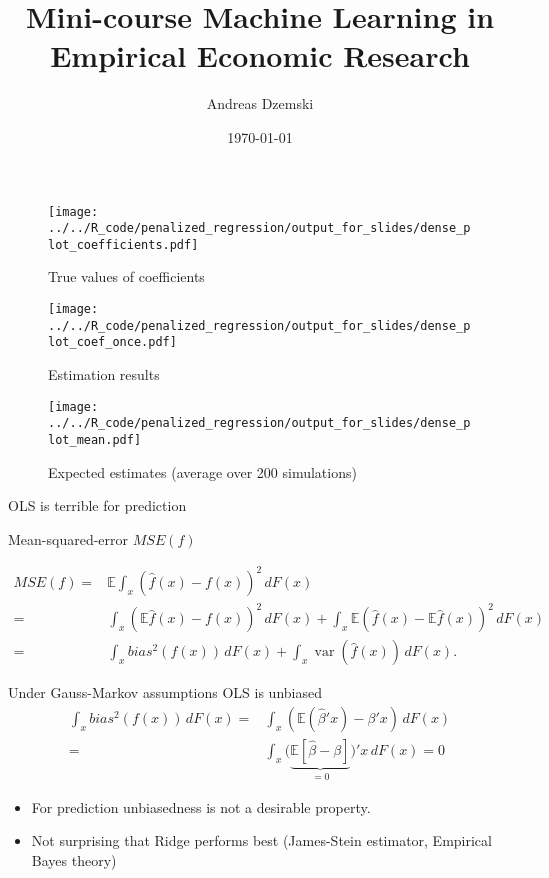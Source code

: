 \documentclass[xcolor=dvipsnames]{beamer}
\author[Dzemski]{Andreas Dzemski\inst{1}}
\institute{\inst{1} University of Gothenburg}
\title{Mini-course Machine Learning in Empirical Economic Research}
\date{\today}
\newcommand{\E}{\mathbb{E}}
\DeclareMathOperator{\var}{var}
\begin{document}
\maketitle

\begin{frame}
\begin{figure}
  \texttt{[image: ../../R\_code/penalized\_regression/output\_for\_slides/dense\_plot\_coefficients.pdf]}
   \caption{True values of coefficients}
\end{figure}
\end{frame}

\begin{frame}
\begin{figure}
  \texttt{[image: ../../R\_code/penalized\_regression/output\_for\_slides/dense\_plot\_coef\_once.pdf]}
   \caption{Estimation results}
\end{figure}
\end{frame}

\begin{frame}
\begin{figure}
  \texttt{[image: ../../R\_code/penalized\_regression/output\_for\_slides/dense\_plot\_mean.pdf]}
   \caption{Expected estimates (average over 200 simulations)}
\end{figure}
\end{frame}

\begin{frame}{OLS is terrible for prediction}
\begin{table}
  
  \caption{Mean-squared-error $MSE(f)$}
\end{table}
\begin{align*}
  MSE(f) = & \E \int_x \left( \hat{f}(x) - f(x) \right)^2 \, dF(x)
  \\
  = & \int_x \left( \E \hat{f}(x) - f(x) \right)^2 \, dF(x)
  + \int_x \E \left(\hat{f}(x) - \E \hat{f}(x)\right)^2 \, dF(x)
  \\
  = & \int_x bias^2\left(f(x)\right) \, dF(x)
  + \int_x \var\left(\hat{f}(x)\right) \, dF(x).
\end{align*}
\end{frame}

\begin{frame}{Under Gauss-Markov assumptions OLS is unbiased}
\begin{align*}
  \int_x bias^2\left(f(x)\right) \, dF(x) =& \int_x (\E (\hat{\beta}'x) - \beta'x) \,dF(x)
  \\
  =& \int_x \big(\underbrace{\E[\hat{\beta} - \beta]}_{=0}  \big)' x \, dF(x) = 0
\end{align*}
\begin{itemize}
  \item For prediction unbiasedness is not a desirable property.
  \item Not surprising that Ridge performs best (James-Stein estimator, Empirical Bayes theory)
\end{itemize}
\end{frame}
\end{document}
